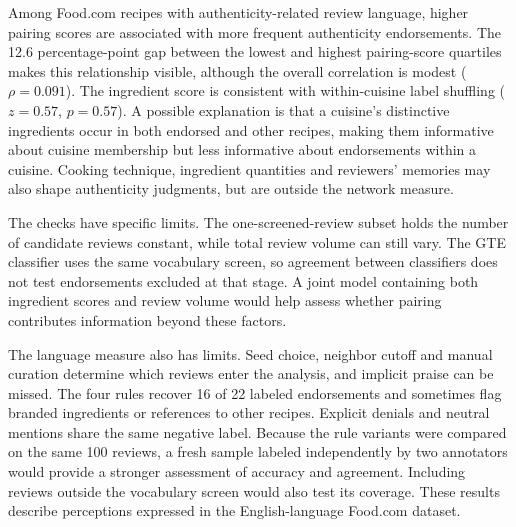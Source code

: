 Among Food.com recipes with authenticity-related review language, higher pairing scores are associated with more frequent authenticity endorsements. The 12.6 percentage-point gap between the lowest and highest pairing-score quartiles makes this relationship visible, although the overall correlation is modest ($\rho = 0.091$). The ingredient score is consistent with within-cuisine label shuffling ($z = 0.57$, $p = 0.57$). A possible explanation is that a cuisine's distinctive ingredients occur in both endorsed and other recipes, making them informative about cuisine membership but less informative about endorsements within a cuisine. Cooking technique, ingredient quantities and reviewers' memories may also shape authenticity judgments, but are outside the network measure.

The checks have specific limits. The one-screened-review subset holds the number of candidate reviews constant, while total review volume can still vary. The GTE classifier uses the same vocabulary screen, so agreement between classifiers does not test endorsements excluded at that stage. A joint model containing both ingredient scores and review volume would help assess whether pairing contributes information beyond these factors.

The language measure also has limits. Seed choice, neighbor cutoff and manual curation determine which reviews enter the analysis, and implicit praise can be missed. The four rules recover 16 of 22 labeled endorsements and sometimes flag branded ingredients or references to other recipes. Explicit denials and neutral mentions share the same negative label. Because the rule variants were compared on the same 100 reviews, a fresh sample labeled independently by two annotators would provide a stronger assessment of accuracy and agreement. Including reviews outside the vocabulary screen would also test its coverage. These results describe perceptions expressed in the English-language Food.com dataset.
